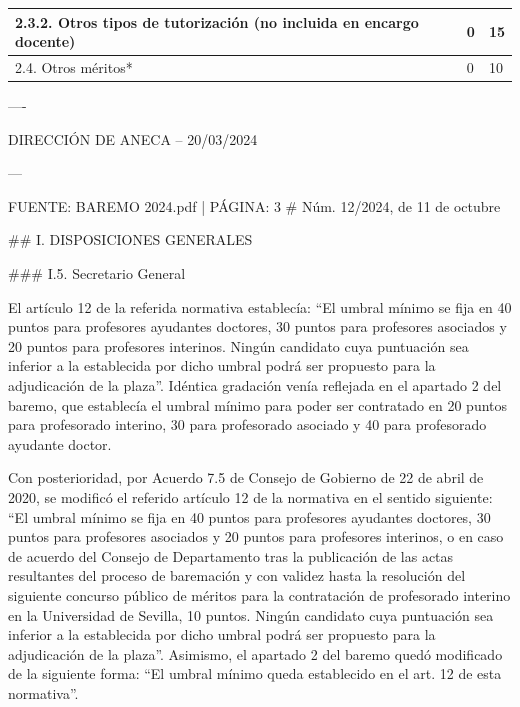 \documentclass{article}
\begin{document}
\begin{itemize}
\begin{itemize}
\begin{scriptsize}
\begin{table}[h!]
\begin{tabular}{|p{}|p{}|p{}|}
                      2.3.2. Otros tipos de tutorización (no incluida en encargo docente) & 0             & 15            \\\hline
                      2.4. Otros méritos*                                                 & 0             & 10            \\\hline
                    \end{tabular}\end{table}
                  \vspace{0.4cm}

                  ----

                  DIRECCIÓN DE ANECA – 20/03/2024

                  ---

                  FUENTE: BAREMO 2024.pdf | PÁGINA: 3
                  \# Núm. 12/2024, de 11 de octubre

                  \#\# I. DISPOSICIONES GENERALES

                  \#\#\# I.5. Secretario General

                  El artículo 12 de la referida normativa establecía: “El umbral mínimo se fija en 40 puntos para profesores ayudantes doctores, 30 puntos para profesores asociados y 20 puntos para profesores interinos. Ningún candidato cuya puntuación sea inferior a la establecida por dicho umbral podrá ser propuesto para la adjudicación de la plaza”. Idéntica gradación venía reflejada en el apartado 2 del baremo, que establecía el umbral mínimo para poder ser contratado en 20 puntos para profesorado interino, 30 para profesorado asociado y 40 para profesorado ayudante doctor.

                  Con posterioridad, por Acuerdo 7.5 de Consejo de Gobierno de 22 de abril de 2020, se modificó el referido artículo 12 de la normativa en el sentido siguiente: “El umbral mínimo se fija en 40 puntos para profesores ayudantes doctores, 30 puntos para profesores asociados y 20 puntos para profesores interinos, o en caso de acuerdo del Consejo de Departamento tras la publicación de las actas resultantes del proceso de baremación y con validez hasta la resolución del siguiente concurso público de méritos para la contratación de profesorado interino en la Universidad de Sevilla, 10 puntos. Ningún candidato cuya puntuación sea inferior a la establecida por dicho umbral podrá ser propuesto para la adjudicación de la plaza”. Asimismo, el apartado 2 del baremo quedó modificado de la siguiente forma: “El umbral mínimo queda establecido en el art. 12 de esta normativa”.


\end{scriptsize}
\end{itemize}
\end{itemize}
\end{document}
